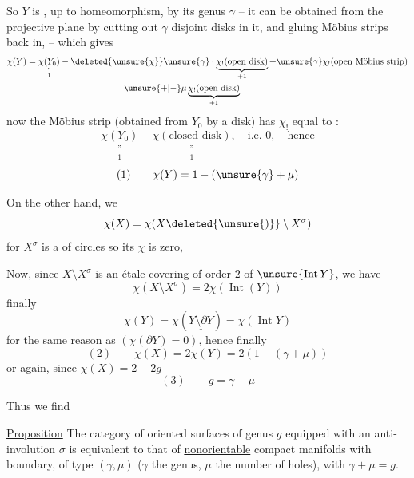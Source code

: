 So $Y$ is , up to homeomorphism, by its genus $\gamma$  -- it can be obtained from the projective plane  by cutting out $\gamma$ disjoint disks in it, and gluing Möbius strips back in,  -- which gives
\[
\begin{aligned}
\chi(Y)&=\underset{\substack{\text{''}\\1}}{\chi(Y_0)}
-\deleted{\unsure{\chi}}\unsure{\gamma}\cdot
\underbrace{\chi_!(\text{open disk})}_{+1}
+\unsure{\gamma}\chi_!(\text{open Möbius strip})\\
&\hspace{11em}\unsure{+|-}\mu\underbrace{\chi_!(\text{open disk})}_{+1}
\end{aligned}
\]
now the  Möbius strip (obtained from $Y_0$ by  a  disk) has  $\chi_!$ equal to :
\[
\underset{\substack{\text{''}\\1}}{\chi(Y_0)}-
\underset{\substack{\text{''}\\1}}{\chi(\text{closed disk})},
\quad \text{i.e. }0,\quad \text{hence}
\]
\[
(1)\qquad \chi(Y)=1-(\unsure{\gamma}+\mu)
\]

On the other hand, we 
\[
\chi(X)=\chi(X\deleted{\unsure{)}}\setminus X^\sigma)
\]
for $X^\sigma$ is a  of circles so its $\chi$ is zero,


Now, since $X\setminus X^\sigma$ is an étale covering of order $2$ of $\unsure{\operatorname{Int}Y}$, we have
\[
\chi(X\setminus X^\sigma)=2\chi(\operatorname{Int}(Y))
\]
finally
\[
\chi(Y)=\chi(\underline{Y\setminus\partial Y})=\chi(\operatorname{Int}Y)
\]
for the same reason as  $(\chi(\partial Y)=0)$,
hence finally
\[
(2)\qquad \chi(X)=2\chi(Y)=2(1-(\gamma+\mu))
\]
 or again, since $\chi(X)=2-2g$
\[
(3)\qquad g=\gamma+\mu
\]

Thus we find


\uline{Proposition} The category of oriented  surfaces of genus $g$ equipped with an anti-involution $\sigma$ is equivalent to that of \uline{nonorientable} compact manifolds with boundary, of type $(\gamma,\mu)$ ($\gamma$ the genus, $\mu$ the number of holes), with $\gamma+\mu=g$.

